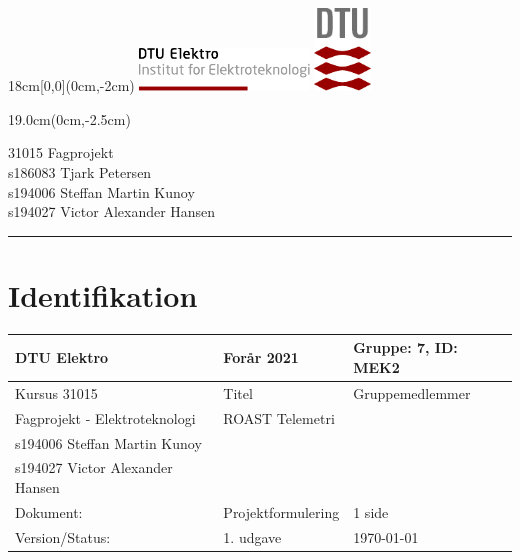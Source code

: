 \documentclass[]{article}
\begin{document}
\thispagestyle{empty}
\vspace*{-1.9cm}
\begin{textblock*}{18cm}[0,0](0cm,-2cm) %
  \noindent
  \includegraphics[width=4.5cm,valign=t]{tex_dtu_elektro_a}
  \hspace*{10.6cm}
  \includegraphics[width=1.5cm,valign=t]{tex_dtu_logo}
\end{textblock*}
\begin{textblock*}{19.0cm}(0cm,-2.5cm) %
\begin{center}
  {\color{dtured}\large31015 Fagprojekt}\\
  \normalsize
  s186083 Tjark Petersen\\
  s194006 Steffan Martin Kunoy\\
  s194027 Victor Alexander Hansen\\
\end{center}
\end{textblock*}
\vspace{1mm}
{\hspace*{-0.1cm}
\color{dtured}\noindent \rule{16.8cm}{5pt}}
 
 \section*{Identifikation}
 
 \begin{table}[H]
     \centering
     \begin{tabularx}{\textwidth}{|X|X|X|}
     \hline
          DTU Elektro&Forår 2021 & Gruppe: 7, ID: MEK2 \\\hline
          Kursus 31015 & Titel & Gruppemedlemmer \\\hline
          Fagprojekt - Elektroteknologi & ROAST Telemetri & \begin{tabular}{l} s186083 Tjark Petersen\\s194006 Steffan Martin Kunoy\\s194027 Victor Alexander Hansen \end{tabular}\\\hline
          Dokument:& Projektformulering & 1 side\\\hline 
          Version/Status: & 1. udgave &\today\\\hline
     \end{tabularx}
 \end{table}
 
\end{document}
